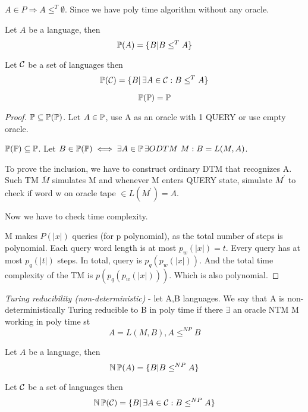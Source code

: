 \begin{example}
	$A \in P \Rightarrow A \leq^T \emptyset$. Since we have poly time algorithm without any oracle.
\end{example}

\begin{definition}[$\TP(A)$]
	Let $A$ be a language, then
	\[ \operatorname{\mathbb{P}}(A) = \{ B | B \leq^T A \} \]
\end{definition}
\begin{definition}[$\TP(\C)$]
	Let $\operatorname{\mathcal{C}}$ be a set of languages then
	\[ \operatorname{\mathbb{P}}(\operatorname{\mathcal{C}}) = \{ B |\, \exists A \in \operatorname{\mathcal{C}}: B \leq^T A \} \]
\end{definition}

\begin{observation}
	\[ \operatorname{\mathbb{P}}(\operatorname{\mathbb{P}}) = \operatorname{\mathbb{P}} \]
\end{observation}
\begin{proof}
	$ \operatorname{\mathbb{P}} \subseteq \operatorname{\mathbb{P}}(\operatorname{\mathbb{P}})$. Let $A \in \operatorname{\mathbb{P}}$, use A as an oracle with 1 QUERY or use empty oracle.

	$\operatorname{\mathbb{P}}(\operatorname{\mathbb{P}}) \subseteq \operatorname{\mathbb{P}}$. Let $B \in \TP(\TP) \iff \exists A \in \TP \exists ODTM\ M: B = L(M, A)$.

	To prove the inclusion, we have to construct ordinary DTM that recognizes A.
	Such TM $\overline{M}$ simulates M and whenever M enters QUERY state, simulate $M^{\prime}$ to check if word w on oracle tape $\in L(M^{\prime}) = A$.

	Now we have to check time complexity.

	M makes $P(|x|)$ queries (for p polynomial), as the total number of steps is polynomial.
	Each query word length is at most $p_w(|x|) = t$.
	Every query has at most $p_q(|t|)$ steps.
	In total, query is $p_q(p_w(|x|))$.
	And the total time complexity of the TM is $p(p_q(p_w(|x|)))$.
	Which is also polynomial.
\end{proof}

\begin{definition}
	\emph{Turing reducibility (non-deterministic)} - let A,B languages.
	We say that A is non-deterministically Turing reducible to B in poly time if there $\exists$ an oracle NTM M working in poly time st
	\[ A = L(M, B), A \leq^{NP} B \]
\end{definition}

\begin{definition}[$\TNP(A)$]
	Let $A$ be a language, then
	\[ \operatorname{\operatorname{\mathbb{N}}\mathbb{P}}(A) = \{ B | B \leq^{NP} A \} \]
\end{definition}
\begin{definition}[$\TNP(\C)$]
	Let $\operatorname{\mathcal{C}}$ be a set of languages then
	\[ \operatorname{\operatorname{\mathbb{N}}\mathbb{P}}(\operatorname{\mathcal{C}}) = \{ B |\, \exists A \in \operatorname{\mathcal{C}}: B \leq^{NP} A \} \]
\end{definition}

